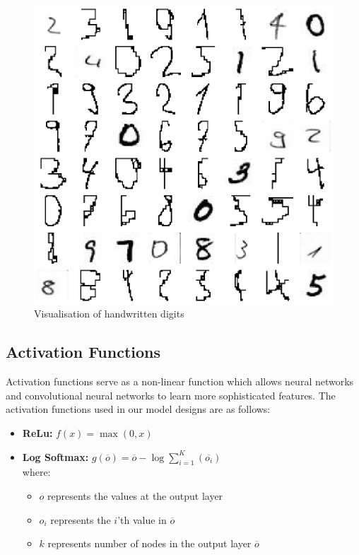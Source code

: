 \documentclass[a4paper,twoside,10pt]{article}
\begin{document}
\begin{figure}[H]
    \centering
    \includegraphics[scale=0.25]{data_visual}
    \caption{Visualisation of handwritten digits}
    \label{fig:data_visual}
\end{figure}

\subsection{Activation Functions}
Activation functions serve as a non-linear function which allows neural networks and convolutional neural networks to learn more sophisticated features. The activation functions used in our model designs are as follows:

\begin{itemize}
    \item \textbf{ReLu:} $f(x) = \max{(0, x)}$
    \item \textbf{Log Softmax:} $g(\overline{o}) = \overline{o} - \log{\sum_{i=1}^{K}{(\overline{o_i})}}$\\
    where:
    \begin{itemize}
        \item $o$ represents the values at the output layer
        \item $o_i$ represents the $i$'th value in $\overline{o}$
        \item $k$ represents number of nodes in the output layer $\overline{o}$
    \end{itemize}
\end{itemize}
\end{document}
